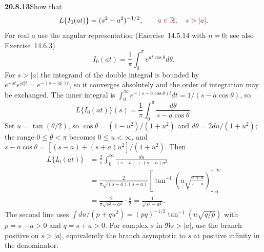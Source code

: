 \par\bigskip
\noindent\textbf{20.8.13}\quad Show that
\[
L\{I_{0}(at)\}=(s^{2}-a^{2})^{-1/2},\qquad\erratum{a\in\mathbb R,\quad s>|a|}.
\]
\solution
For real $a$ use the angular representation
(Exercise~14.5.14 with $n=0$; see also Exercise~14.6.3)
\[
I_0(at)=\frac1\pi\int_0^\pi e^{at\cos\theta}d\theta.
\]
For $s>|a|$ the integrand of the double integral is bounded by
$e^{-st}e^{|a|t}=e^{-(s-|a|)t}$, so it converges absolutely and
the order of integration may be exchanged. The inner integral
is $\int_0^\infty e^{-(s-a\cos\theta)t}dt=1/(s-a\cos\theta)$,
so
\[
L\{I_0(at)\}(s)=\frac1\pi\int_0^\pi
\frac{d\theta}{s-a\cos\theta}.
\]
Set $u=\tan(\theta/2)$, so
$\cos\theta=(1-u^2)/(1+u^2)$ and
$d\theta=2du/(1+u^2)$; the range $0\le\theta<\pi$ becomes
$0\le u<\infty$, and
$s-a\cos\theta=[(s-a)+(s+a)u^2]/(1+u^2)$. Then
\begin{align*}
L\{I_0(at)\}
&=\frac2\pi\int_0^\infty
\frac{du}{(s-a)+(s+a)u^2}\\
&=\frac2{\pi\sqrt{(s-a)(s+a)}}
\left[\tan^{-1}\left(u\sqrt{\frac{s+a}{s-a}}\right)\right]_0^\infty\\
&=\frac2{\pi\sqrt{s^2-a^2}}\cdot\frac\pi2
=\boxed{\frac1{\sqrt{s^2-a^2}}}.
\end{align*}
The second line uses
$\int du/(p+qu^2)=(pq)^{-1/2}\tan^{-1}(u\sqrt{q/p})$ with
$p=s-a>0$ and $q=s+a>0$.
For complex $s$ in $\Re s>|a|$, use the branch positive on
$s>|a|$, equivalently the branch asymptotic to $s$ at positive
infinity in the denominator.

